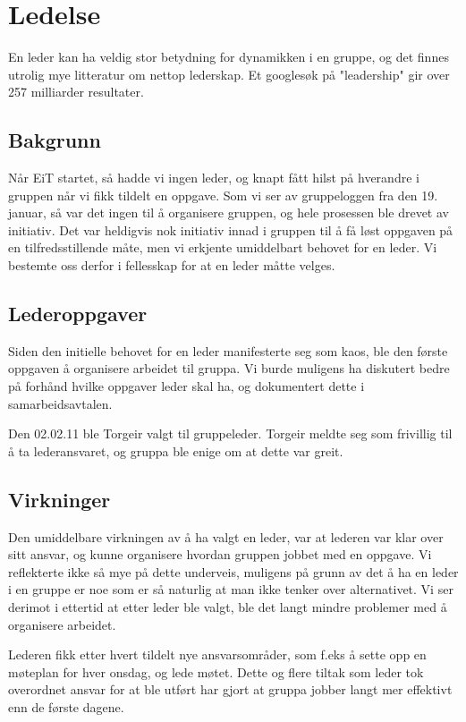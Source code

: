 \chapter{Ledelse}
En leder kan ha veldig stor betydning for dynamikken i en gruppe, og det finnes
utrolig mye litteratur om nettop lederskap. Et googlesøk på "leadership" gir
over 257 milliarder resultater.

\section{Bakgrunn}
Når EiT startet, så hadde vi ingen leder, og knapt fått hilst på hverandre i
gruppen når vi fikk tildelt en oppgave. Som vi ser av gruppeloggen fra den 19.
januar, så var det ingen til å organisere gruppen, og hele prosessen ble drevet
av initiativ. Det var heldigvis nok initiativ innad i gruppen til å få løst
oppgaven på en tilfredsstillende måte, men vi erkjente umiddelbart behovet for
en leder. Vi bestemte oss derfor i fellesskap for at en leder måtte velges.

\section{Lederoppgaver}
Siden den initielle behovet for en leder manifesterte seg som kaos, ble den
første oppgaven å organisere arbeidet til gruppa.
Vi burde muligens ha diskutert bedre på forhånd hvilke oppgaver leder skal ha,
og dokumentert dette i samarbeidsavtalen.

Den 02.02.11 ble Torgeir valgt til gruppeleder. Torgeir meldte seg som frivillig
til å ta lederansvaret, og gruppa ble enige om at dette var greit.

\section{Virkninger}
Den umiddelbare virkningen av å ha valgt en leder, var at lederen var klar over
sitt ansvar, og kunne organisere hvordan gruppen jobbet med en oppgave. Vi 
reflekterte ikke så mye på dette underveis, muligens på grunn av det å ha en
leder i en gruppe er noe som er så naturlig at man ikke tenker over
alternativet. Vi ser derimot i ettertid at etter leder ble valgt, ble det langt
mindre problemer med å organisere arbeidet.

Lederen fikk etter hvert tildelt nye ansvarsområder, som f.eks å sette opp en
møteplan for hver onsdag, og lede møtet. Dette og flere tiltak som leder tok
overordnet ansvar for at ble utført har gjort at gruppa jobber langt mer
effektivt enn de første dagene.


